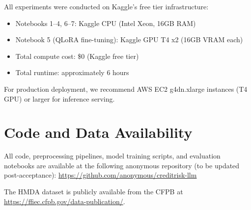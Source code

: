 \documentclass[11pt,a4paper]{article}
\begin{document}
All experiments were conducted on Kaggle's free tier infrastructure:
\begin{itemize}
    \item Notebooks 1--4, 6--7: Kaggle CPU (Intel Xeon, 16GB RAM)
    \item Notebook 5 (QLoRA fine-tuning): Kaggle GPU T4 x2 (16GB VRAM each)
    \item Total compute cost: \$0 (Kaggle free tier)
    \item Total runtime: approximately 6 hours
\end{itemize}

For production deployment, we recommend AWS EC2 g4dn.xlarge instances (T4 GPU) or larger for inference serving.

\section{Code and Data Availability}

All code, preprocessing pipelines, model training scripts, and evaluation notebooks are available at the following anonymous repository (to be updated post-acceptance): \url{https://github.com/anonymous/creditrisk-llm}

The HMDA dataset is publicly available from the CFPB at \url{https://ffiec.cfpb.gov/data-publication/}.
\end{document}
